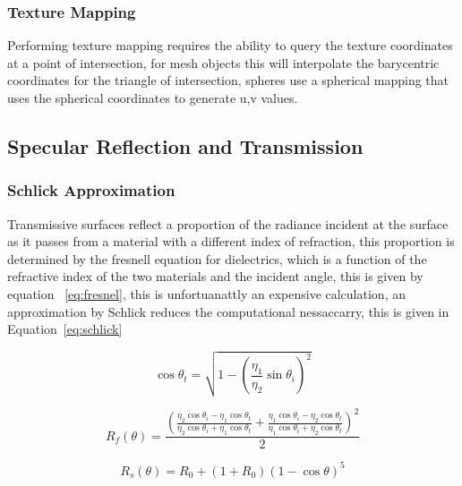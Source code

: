 
\subsubsection{Texture Mapping}
Performing texture mapping requires the ability to query the texture coordinates at a point of intersection, for mesh objects this
will interpolate the barycentric coordinates for the triangle of intersection, spheres use a spherical mapping that uses the
spherical coordinates to generate u,v values.

\subsection{Specular Reflection and Transmission}
\subsubsection{Schlick Approximation}
Transmissive surfaces reflect a proportion of the radiance incident at the surface as it passes from a material with a different
index of refraction, this proportion is determined by the fresnell equation for dielectrics, which is a function of the refractive
index of the two materials and the incident angle, this is given by equation ~\ref{eq:fresnel}, this is unfortuanattly an expensive
calculation, an approximation by Schlick  reduces the computational nessaccarry, this is given in Equation~\ref{eq:schlick}



\begin{equation}
\cos{\theta_t} = \sqrt{1 - \left(\frac{\eta_1}{\eta_2}\sin{\theta_i}\right)^2}
\end{equation}

\begin{equation}
R_f(\theta)
=
\frac{
	\left(
	\frac
	{
	\eta_2 \cos{\theta_i} - \eta_1 \cos{\theta_t}
	}
	{
	\eta_2 \cos{\theta_i} + \eta_1 \cos{\theta_t}
	}
	+
	\frac
	{
	\eta_1 \cos{\theta_i} - \eta_2 \cos{\theta_t}
	}
	{
	\eta_1 \cos{\theta_i} + \eta_2 \cos{\theta_t}
	}
\right)^2
}{2}
\label{eq:fresnel}
\end{equation}

\begin{equation}
R_s(\theta)=R_0 + \left(1 + R_0\right)\left(1 - \cos\theta\right)^5
\label{eq:schlick}
\end{equation}

